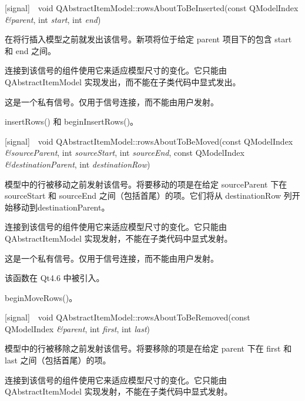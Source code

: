 [signal] void QAbstractItemModel::rowsAboutToBeInserted(const QModelIndex \emph{\&parent}, int \emph{start}, int \emph{end})

在将行插入模型之前就发出该信号。新项将位于给定 parent 项目下的包含 start 和 end 之间。

\begin{notice}
连接到该信号的组件使用它来适应模型尺寸的变化。它只能由 QAbstractItemModel 实现发出，而不能在子类代码中显式发出。
\end{notice}

\begin{notice}
这是一个私有信号。仅用于信号连接，而不能由用户发射。
\end{notice}

\begin{seeAlso}
insertRows() 和 beginInsertRows()。
\end{seeAlso}

[signal] void QAbstractItemModel::rowsAboutToBeMoved(const QModelIndex \emph{\&sourceParent}, int \emph{sourceStart}, int \emph{sourceEnd}, const QModelIndex \emph{\&destinationParent}, int \emph{destinationRow})

模型中的行被移动之前发射该信号。将要移动的项是在给定 sourceParent 下在 sourceStart 和 sourceEnd 之间（包括首尾）的项。它们将从 destinationRow 列开始移动到destinationParent。

\begin{notice}
连接到该信号的组件使用它来适应模型尺寸的变化。它只能由 QAbstractItemModel 实现发射，不能在子类代码中显式发射。
\end{notice}

\begin{notice}
这是一个私有信号。仅用于信号连接，而不能由用户发射。
\end{notice}

该函数在 Qt4.6 中被引入。

\begin{seeAlso}
beginMoveRows()。
\end{seeAlso}

[signal] void QAbstractItemModel::rowsAboutToBeRemoved(const QModelIndex \emph{\&parent}, int \emph{first}, int \emph{last})

模型中的行被移除之前发射该信号。将要移除的项是在给定 parent 下在 first 和 last 之间（包括首尾）的项。

\begin{notice}
连接到该信号的组件使用它来适应模型尺寸的变化。它只能由 QAbstractItemModel 实现发射，不能在子类代码中显式发射。
\end{notice} 


